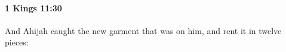 
		\paragraph{1 Kings 11:30} %
			\label{1KINGS-11-30}

			And Ahijah caught the new garment that was on him, and rent it in twelve pieces:


